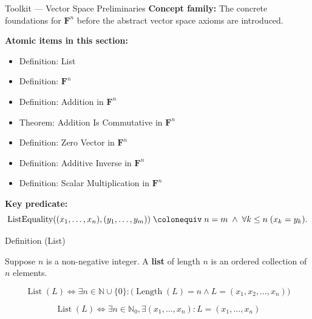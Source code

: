 
\begin{toolkitbox}{Toolkit --- Vector Space Preliminaries}
\textbf{Concept family:} The concrete foundations for $\mathbf{F}^n$ before the
abstract vector space axioms are introduced.

\medskip
\textbf{Atomic items in this section:}
\begin{itemize}
  \item Definition: List
  \item Definition: $\mathbf{F}^n$
  \item Definition: Addition in $\mathbf{F}^n$
  \item Theorem: Addition Is Commutative in $\mathbf{F}^n$
  \item Definition: Zero Vector in $\mathbf{F}^n$
  \item Definition: Additive Inverse in $\mathbf{F}^n$
  \item Definition: Scalar Multiplication in $\mathbf{F}^n$
\end{itemize}

\medskip
\textbf{Key predicate:}
\[
  \operatorname{ListEquality}((x_1,\ldots,x_n),(y_1,\ldots,y_m))
  \;\colonequiv\;
  n = m \;\wedge\; \forall k \le n\;(x_k = y_k).
\]
\end{toolkitbox}


\begin{definitionbox}{Definition (List)}
\begin{definition}[List]
\label{def:list}
Suppose $n$ is a non-negative integer. A \textbf{list} of length $n$ is an ordered collection of $n$ elements.
\end{definition}
\end{definitionbox}

\begin{remark*}
\[
\operatorname{List}(L) \iff \exists n \in \mathbb{N} \cup \{0\} : \bigl( \operatorname{Length}(L) = n \land L = (x_1, x_2, \dots, x_n) \bigr)
\]
\end{remark*}

\begin{remark*}
\[
\operatorname{List}(L) \iff \exists n \in \mathbb{N}_0, \exists (x_1, \dots, x_n) : L = (x_1, \dots, x_n)
\]
\end{remark*}


